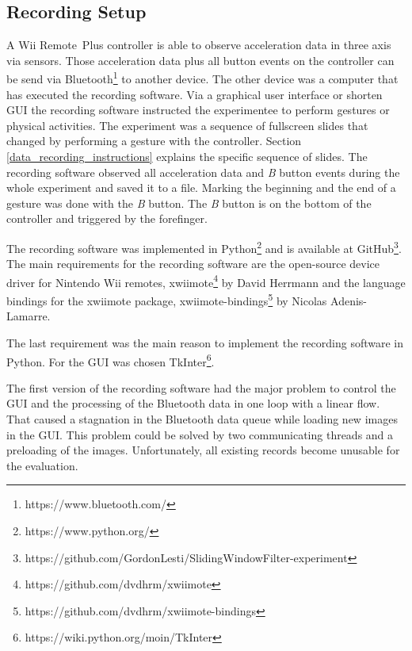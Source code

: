 \subsection{Recording Setup} \label{recording_setup}
A Wii Remote\texttrademark~Plus controller is able to observe acceleration data in three axis via sensors. Those
acceleration data plus all button events on the controller can be send via
Bluetooth\footnote{https://www.bluetooth.com/} to another device. The other device was a computer that has executed the
recording software. Via a graphical user interface or shorten GUI the recording software instructed the experimentee to
perform gestures or physical activities. The experiment was a sequence of fullscreen slides that changed by performing a
gesture with the controller. Section \ref{data_recording_instructions} explains the specific sequence of slides. The
recording software observed all acceleration data and \textit{B} button events during the whole experiment and saved it
to a file. Marking the beginning and the end of a gesture was done with the \textit{B} button. The \textit{B}
button is on the bottom of the controller and triggered by the forefinger.

The recording software was implemented in Python\footnote{https://www.python.org/} and is available at
GitHub\footnote{https://github.com/GordonLesti/SlidingWindowFilter-experiment}. The main requirements for the recording
software are the open-source device driver for Nintendo Wii remotes,
xwiimote\footnote{https://github.com/dvdhrm/xwiimote} by David Herrmann and the language bindings for the xwiimote
package, xwiimote-bindings\footnote{https://github.com/dvdhrm/xwiimote-bindings} by Nicolas Adenis-Lamarre.

The last requirement was the main reason to implement the recording software in Python. For the GUI was chosen
TkInter\footnote{https://wiki.python.org/moin/TkInter}.

The first version of the recording software had the major problem to control the GUI and the
processing of the Bluetooth data in one loop with a linear flow. That caused a stagnation in the Bluetooth data queue
while loading new images in the GUI. This problem could be solved by two communicating threads and a preloading of the
images. Unfortunately, all existing records become unusable for the evaluation.


